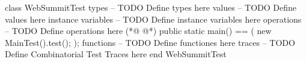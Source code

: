 \begin{vdmpp}[breaklines=true]
class WebSummitTest
types
-- TODO Define types here
values
-- TODO Define values here
instance variables
-- TODO Define instance variables here
operations
-- TODO Define operations here
(*@
\label{main:10}
@*)
  public static main() == (
  new MainTest().test();
 );
functions
-- TODO Define functiones here
traces
-- TODO Define Combinatorial Test Traces here
end WebSummitTest
\end{vdmpp}

